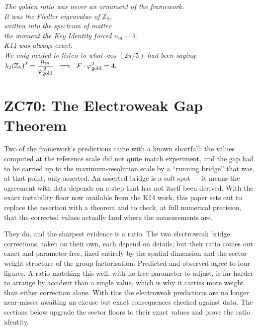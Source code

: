 \documentclass[12pt, a4paper]{article}
\begin{document}
\bigskip
\begin{center}
\textit{%
  The golden ratio was never an ornament of the framework.\\
  It was the Fiedler eigenvalue of $\mathbb{Z}_5$,\\
  written into the spectrum of matter\\
  the moment the Key Identity forced $n_m = 5$.\\[0.6em]
  K14 was always exact.\\
  We only needed to listen to what $\cos(2\pi/5)$ had been saying:\\[0.6em]
  $\displaystyle
    \lambda_2(\mathbb{Z}_5)^2 = \frac{n_m}{\varphi_{\rm gold}^{\,2}}
    \;\implies\;
    F\cdot\varphi_{\rm gold}^{2} = 4.
  $
}
\end{center}




\section{ZC70: The Electroweak Gap Theorem}

Two of the framework's predictions came with a known shortfall: the values
computed at the reference scale did not quite match experiment, and the gap had
to be carried up to the maximum-resolution scale by a ``running bridge'' that
was, at that point, only asserted. An asserted bridge is a soft spot --- it
means the agreement with data depends on a step that has not itself been
derived. With the exact instability floor now available from the K14 work, this
paper sets out to replace the assertion with a theorem and to check, at full
numerical precision, that the corrected values actually land where the
measurements are.

They do, and the sharpest evidence is a ratio. The two electroweak bridge
corrections, taken on their own, each depend on details; but their ratio comes
out exact and parameter-free, fixed entirely by the spatial dimension and the
sector-weight structure of the group factorisation. Predicted and observed
agree to four figures. A ratio matching this well, with no free parameter to
adjust, is far harder to arrange by accident than a single value, which is why
it carries more weight than either correction alone. With this the electroweak
predictions are no longer near-misses awaiting an excuse but exact consequences
checked against data. The sections below upgrade the sector floors to their
exact values and prove the ratio identity.
\label{sec:zc70}
\end{document}
